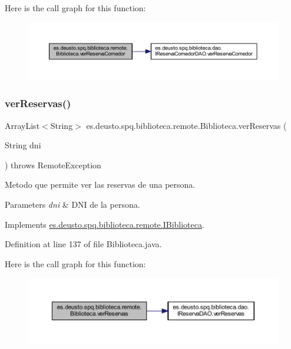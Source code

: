 Here is the call graph for this function\+:
\nopagebreak
\begin{figure}[H]
\begin{center}
\leavevmode
\includegraphics[width=350pt]{classes_1_1deusto_1_1spq_1_1biblioteca_1_1remote_1_1_biblioteca_a4bbd6c5f2df8f41fd0b5fb61564a1bfd_cgraph}
\end{center}
\end{figure}
\mbox{\label{classes_1_1deusto_1_1spq_1_1biblioteca_1_1remote_1_1_biblioteca_a809e1bd178fbd41b865f827fd074e8c4}} 
\subsubsection{\texorpdfstring{ver\+Reservas()}{verReservas()}}
{\footnotesize\ttfamily Array\+List$<$String$>$ es.\+deusto.\+spq.\+biblioteca.\+remote.\+Biblioteca.\+ver\+Reservas (\begin{DoxyParamCaption}\item[{String}]{dni }\end{DoxyParamCaption}) throws Remote\+Exception}

Metodo que permite ver las reservas de una persona. 
\begin{DoxyParams}{Parameters}
{\em dni} & D\+NI de la persona. \\
\hline
\end{DoxyParams}


Implements \mbox{\hyperlink{interfacees_1_1deusto_1_1spq_1_1biblioteca_1_1remote_1_1_i_biblioteca_a9ad945750f5db60c869a696e276f7421}{es.\+deusto.\+spq.\+biblioteca.\+remote.\+I\+Biblioteca}}.



Definition at line 137 of file Biblioteca.\+java.

Here is the call graph for this function\+:
\nopagebreak
\begin{figure}[H]
\begin{center}
\leavevmode
\includegraphics[width=350pt]{classes_1_1deusto_1_1spq_1_1biblioteca_1_1remote_1_1_biblioteca_a809e1bd178fbd41b865f827fd074e8c4_cgraph}
\end{center}
\end{figure}


